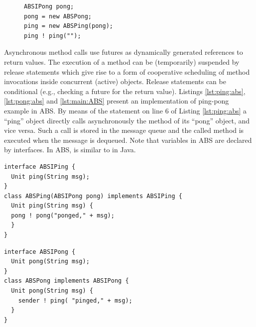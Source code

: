 \lstset{language=Java}
\begin{figure}[h]
\begin{lstlisting}[caption=main in ABS,label=lst:main:ABS]
ABSIPong pong;
pong = new ABSPong;
ping = new ABSPing(pong);
ping ! ping("");
\end{lstlisting}
\end{figure}

Asynchronous method calls use futures as dynamically generated references  to return values.
The execution of a method can be (temporarily) suspended by release statements which give rise to a form
of  cooperative scheduling of method invocations inside concurrent (active) objects.
Release statements can be conditional (e.g., checking a future for the return value).
Listings \ref{lst:ping:abs}, \ref{lst:pong:abs} and \ref{lst:main:ABS} present an implementation of ping-pong example in ABS.
By means of the statement on line 6 of Listing \ref{lst:ping:abs}
a ``ping'' object  directly calls asynchronously the  method  of its ``pong'' object, and vice versa.
Such a call is stored in the message queue and the called method is executed when the message is dequeued.
Note that variables in ABS are declared by interfaces.
In ABS,  is similar to  in Java.

\lstset{language=abs}
\begin{center}
\begin{minipage}[t]{0.48\textwidth}
\begin{lstlisting}[caption=Ping in ABS,label=lst:ping:abs]
interface ABSIPing {
  Unit ping(String msg);
}
class ABSPing(ABSIPong pong) implements ABSIPing {
  Unit ping(String msg) {
  pong ! pong("ponged," + msg);
  }
}
\end{lstlisting}
\end{minipage}
\hfill
\begin{minipage}[t]{0.48\textwidth}
\begin{lstlisting}[caption=Pong in ABS,label=lst:pong:abs]
interface ABSIPong {
  Unit pong(String msg);
}
class ABSPong implements ABSIPong {
  Unit pong(String msg) {
    sender ! ping( "pinged," + msg);
  }
}
\end{lstlisting}
\end{minipage}
\end{center}
\lstset{language=Java}

